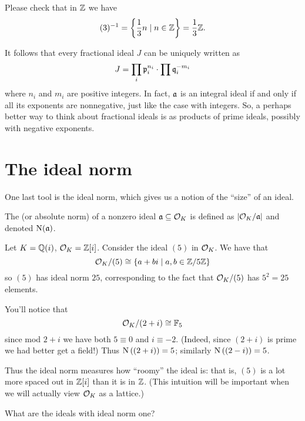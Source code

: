 \begin{example}[$(3)\inv$ in $\ZZ$]
	Please check that in $\ZZ$ we have
	\[ (3)^{-1} = \left\{ \frac 13 n \mid n \in \mathbb Z \right\} = \frac 13 \mathbb Z. \]
\end{example}

It follows that every fractional ideal $J$ can be uniquely written as
\[ J = \prod_i \mathfrak p_i^{n_i} \cdot \prod \mathfrak q_i^{-m_i} \]
where $n_i$ and $m_i$ are positive integers.
In fact, $\mathfrak a$ is an integral ideal if and only if all its exponents are nonnegative,
just like the case with integers.
So, a perhaps better way to think about fractional ideals is
as products of prime ideals, possibly with negative exponents.

\section{The ideal norm}
One last tool is the ideal norm,
which gives us a notion of the ``size'' of an ideal.
\begin{definition}
	The  (or absolute norm)
	of a nonzero ideal $\mathfrak a \subseteq \mathcal O_K$ is defined as
	$|\mathcal O_K / \mathfrak a|$ and denoted $\operatorname{N}(\mathfrak a)$.
\end{definition}
\begin{example}
	Let $K = \mathbb Q(i)$, $\mathcal O_K = \mathbb Z[i]$.
	Consider the ideal $(5)$ in $\mathcal O_K$.
	We have that
	\[ \mathcal O_K / (5) \cong \{ a+bi \mid a,b \in \mathbb Z/5\mathbb Z \} \]
	so $(5)$ has ideal norm $25$,
	corresponding to the fact that $\mathcal O_K/(5)$ has $5^2=25$ elements.
\end{example}

\begin{example}
	You'll notice that \[ \mathcal O_K / (2+i) \cong \mathbb F_5 \]
	since mod $2+i$ we have both $5 \equiv 0$ and $i \equiv -2$.
	(Indeed, since $(2+i)$ is prime we had better get a field!)
	Thus $\operatorname{N}\left( (2+i) \right) = 5$; similarly $\operatorname{N}\left( (2-i) \right) = 5$.
\end{example}

Thus the ideal norm measures how ``roomy'' the ideal is:
that is, $(5)$ is a lot more spaced out in $\mathbb Z[i]$ than it is in $\ZZ$.
(This intuition will be important when we will actually view $\mathcal O_K$ as a lattice.)

\begin{ques}
	What are the ideals with ideal norm one?
\end{ques}

